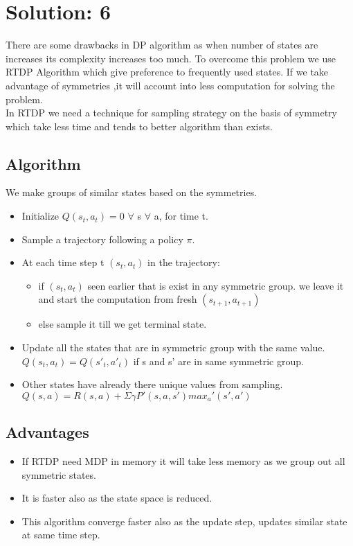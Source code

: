 \documentclass{article}
\begin{document}
\section{Solution: 6}
There are some drawbacks in DP algorithm as when number of states are increases its complexity increases too much. To overcome this problem we use RTDP Algorithm which give preference to frequently used states. If we take advantage of symmetries ,it will account into less computation for solving the problem.
\\In RTDP we need a technique for sampling strategy on the basis of symmetry which take less time and tends to better algorithm than exists.
\subsection*{Algorithm}
We make groups of similar states based on the symmetries.
\begin{itemize}
\item Initialize $Q(s_t,a_t)=0 $  $\forall$ s $\forall$ a, for time t.
\item Sample a trajectory following a policy $\pi$.
\item At each time step t $(s_t,a_t)$ in the trajectory:
\begin{itemize}
\item if $(s_t,a_t)$ seen earlier that is exist in any symmetric group. we leave it and start the computation from fresh $(s_{t+1},a_{t+1})$
\item else sample it till we get terminal state.
\end{itemize}
\item Update all the states that are in symmetric group with the same value. $Q(s_t,a_t)=Q(s'_t,a'_t)$ if s and s' are in same symmetric group.
\item Other states have already there unique values from sampling. $Q(s,a)=R(s,a)+\Sigma\gamma P'(s,a,s')max_a{'}(s',a')$

\end{itemize}
\subsection*{Advantages}
\begin{itemize}
\item If RTDP need MDP in memory it will take less memory as we group out all symmetric states.

\item It is faster also as the state space is reduced.
\item This algorithm converge faster also as the update step, updates similar state at same time step. 
\end{itemize}
\end{document}
